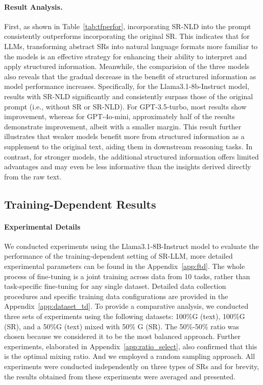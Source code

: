 \paragraph{Result Analysis.} First, as shown in Table~\ref{tab:tfperfor}, incorporating SR-NLD into the prompt consistently outperforms incorporating the original SR. This indicates that for LLMs, transforming abstract SRs into natural language formats more familiar to the models is an effective strategy for enhancing their ability to interpret and apply structured information. Meanwhile, the comparision of the three models also reveals that the gradual decrease in the benefit of structured information as model performance increases. Specifically, for the Llama3.1-8b-Instruct model, results with SR-NLD significantly and consistently surpass those of the original prompt (i.e., without SR or SR-NLD). For GPT-3.5-turbo, most results show improvement, whereas for GPT-4o-mini, approximately half of the results demonstrate improvement, albeit with a smaller margin. This result further illustrates that weaker models benefit more from structured information as a supplement to the original text, aiding them in downstream reasoning tasks. In contrast, for stronger models, the additional structured information offers limited advantages and may even be less informative than the insights derived directly from the raw text. 


\subsection{Training-Dependent Results}
\paragraph{Experimental Details}
We conducted experiments using the Llama3.1-8B-Instruct model to evaluate the performance of the training-dependent setting of SR-LLM, more detailed experimental parameters can be found in the Appendix~\ref{app:ftd}. The whole process of fine-tuning is a joint training across data from 10 tasks, rather than task-specific fine-tuning for any single dataset. Detailed data collection procedures and specific training data configurations are provided in the Appendix~\ref{app:dataset_td}. 
To provide a comparative analysis, we conducted three sets of experiments using the following datasets: 100\%G (text), 100\%G (SR), and a 50\%G (text) mixed with 50\% G (SR). The 50\%-50\% ratio was chosen because we considered it to be the most balanced approach. Further experiments, elaborated in Appendix~\ref{app:ratio_select}, also confirmed that this is the optimal mixing ratio. And we employed a random sampling approach. All experiments were conducted independently on three types of SRs and for brevity, the results obtained from these experiments were averaged and presented.

